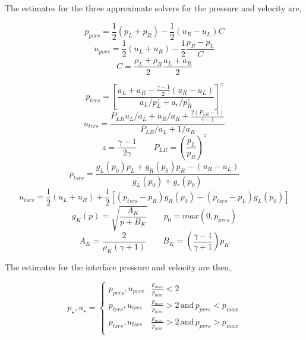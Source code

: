 \documentclass{article}
\begin{document}
The estimates for the three approximate solvers for the pressure and velocity are,

\begin{equation}
p_{pvrs} = \frac{1}{2} ( p_L + p_R) - \frac{1}{2} ( u_R - u_L) C
\end{equation}
\begin{equation}
u_{pvrs} = \frac{1}{2} (u_L + u_R) - \frac{1}{2} \frac{p_R - p_L}{C}
\end{equation}
\begin{equation}
C = \frac{\rho_L + \rho_R}{2} \frac{a_L + a_R}{2}
\end{equation}

\begin{equation}
p_{trrs} = \left[ \frac{a_L+a_R - \frac{\gamma -1}{2} ( u_R - u_L)}{a_L/p_L^z + a_r/p_R^z}\right]^z
\end{equation}
\begin{equation}
u_{trrs} = \frac{P_{LR} u_L/a_L + u_R/a_R + \frac{2(P_{LR}-1)}{\gamma -1}}{P_{LR}/a_L + 1/a_R}
\end{equation}
\begin{equation}
z = \frac{\gamma -1}{2 \gamma} \qquad P_{LR} = \left( \frac{p_L}{p_R} \right)^z
\end{equation}
\begin{equation}
p_{tsrs} = \frac{g_L(p_0) p_L + g_R(p_0) p_R - (u_R - u_L)}{g_L(p_0) + g_r(p_0)}
\end{equation}
\begin{equation}
u_{tsrs} = \frac{1}{2} (u_L + u_R) + \frac{1}{2}\left[ (p_{tsrs}-p_R) g_R(p_0) - (p_{tsrs} - p_L) g_L(p_0) \right]
\end{equation}
\begin{equation}
g_K (p) =\sqrt{\frac{ A_K}{p + B_K}} \qquad p_0 = max(0,p_{pvrs})
\end{equation}
\begin{equation}
A_K =  \frac{2}{\rho_K ( \gamma + 1 ) } \qquad B_K = \left( \frac{\gamma -1}{\gamma + 1} \right) p_K
\end{equation}

The estimates for the interface pressure and velocity are then,

\begin{equation}
p_\star,u_\star = 
\begin{cases}
p_{pvrs},u_{pvrs} & \frac{p_{max}}{p_{min}} < 2 \\
p_{trrs}, u_{trrs} & \frac{p_{max}}{p_{min}} > 2 \, \text{and} \, p_{pvrs} < p_{max} \\ 
p_{tsrs}, u_{tsrs} & \frac{p_{max}}{p_{min}} > 2 \, \text{and} \, p_{pvrs} > p_{max} \\ 
\end{cases}
\end{equation}
\end{document}
